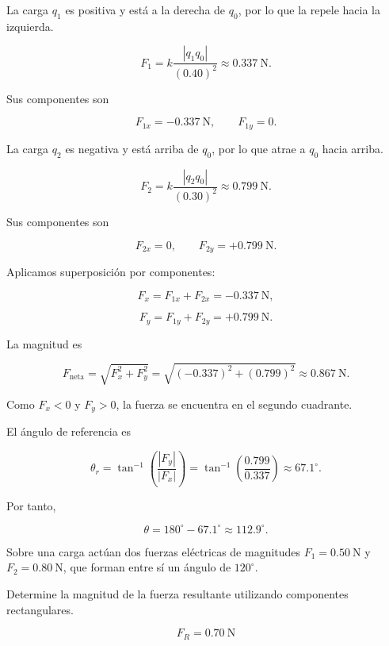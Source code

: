 \begin{explicacion}
La carga \(q_1\) es positiva y está a la derecha de \(q_0\), por lo que la
repele hacia la izquierda.

\[
F_1=k\frac{|q_1q_0|}{(0.40)^2}
\approx\SI{0.337}{\newton}.
\]

Sus componentes son

\[
F_{1x}=-\SI{0.337}{\newton}, \qquad F_{1y}=0.
\]

La carga \(q_2\) es negativa y está arriba de \(q_0\), por lo que atrae a
\(q_0\) hacia arriba.

\[
F_2=k\frac{|q_2q_0|}{(0.30)^2}
\approx\SI{0.799}{\newton}.
\]

Sus componentes son

\[
F_{2x}=0, \qquad F_{2y}=+\SI{0.799}{\newton}.
\]

Aplicamos superposición por componentes:

\[
F_x=F_{1x}+F_{2x}=-\SI{0.337}{\newton},
\]

\[
F_y=F_{1y}+F_{2y}=+\SI{0.799}{\newton}.
\]

La magnitud es

\[
F_{\text{neta}}=\sqrt{F_x^2+F_y^2}
=\sqrt{(-0.337)^2+(0.799)^2}
\approx\SI{0.867}{\newton}.
\]

Como \(F_x<0\) y \(F_y>0\), la fuerza se encuentra en el segundo cuadrante.

El ángulo de referencia es

\[
\theta_r=\tan^{-1}\left(\frac{|F_y|}{|F_x|}\right)
=\tan^{-1}\left(\frac{0.799}{0.337}\right)
\approx67.1^\circ.
\]

Por tanto,

\[
\boxed{\theta=180^\circ-67.1^\circ\approx112.9^\circ}.
\]
\end{explicacion}


\begin{ejercicio}
Sobre una carga actúan dos fuerzas eléctricas de magnitudes
\(F_1=\SI{0.50}{\newton}\) y \(F_2=\SI{0.80}{\newton}\), que forman entre sí
un ángulo de \(120^\circ\).

Determine la magnitud de la fuerza resultante utilizando componentes
rectangulares.
\end{ejercicio}

\begin{respuesta}
\[
\boxed{F_R=\SI{0.70}{\newton}}
\]
\end{respuesta}

